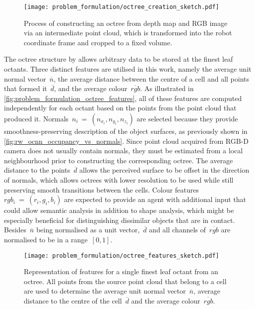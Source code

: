 \begin{figure}[ht]
    \centering
    \texttt{[image: problem\_formulation/octree\_creation\_sketch.pdf]}
    \caption{Process of constructing an octree from depth map and RGB image via an intermediate point cloud, which is transformed into the robot coordinate frame and cropped to a fixed volume.}
    \label{fig:problem_formulation_octree_creation_sketch}
\end{figure}

The octree structure by \citet{wang_o-cnn_2017} allows arbitrary data to be stored at the finest leaf octants. Three distinct features are utilised in this work, namely the average unit normal vector~\(\overline{n}\), the average distance between the centre of a cell and all points that formed it~\(\overline{d}\), and the average colour~\(\overline{rgb}\). As illustrated in \autoref{fig:problem_formulation_octree_features}, all of these features are computed independently for each octant based on the points from the point cloud that produced it. Normals~\(n_{i}~{=}~(n_{x_{i}},n_{y_{i}},n_{z_{i}})\) are selected because they provide smoothness-preserving description of the object surfaces, as previously shown in \autoref{fig:rw_ocnn_occupancy_vs_normals}. Since point cloud acquired from RGB-D camera does not usually contain normals, they must be estimated from a local neighbourhood prior to constructing the corresponding octree. The average distance to the points~\(\overline{d}\) allows the perceived surface to be offset in the direction of normals, which allows octrees with lower resolution to be used while still preserving smooth transitions between the cells. Colour features~\(rgb_{i}~{=}~(r_{i},g_{i},b_{i})\) are expected to provide an agent with additional input that could allow semantic analysis in addition to shape analysis, which might be especially beneficial for distinguishing dissimilar objects that are in contact. Besides~\(\overline{n}\) being normalised as a unit vector,~\(\overline{d}\) and all channels of~\(\overline{rgb}\) are normalised to be in a range~\([0,1]\).

\begin{figure}[ht]
    \centering
    \texttt{[image: problem\_formulation/octree\_features\_sketch.pdf]}
    \caption{Representation of features for a single finest leaf octant from an octree. All points from the source point cloud that belong to a cell are used to determine the average unit normal vector~\(\overline{n}\), average distance to the centre of the cell~\(\overline{d}\) and the average colour~\(\overline{rgb}\).}
    \label{fig:problem_formulation_octree_features}
\end{figure}


